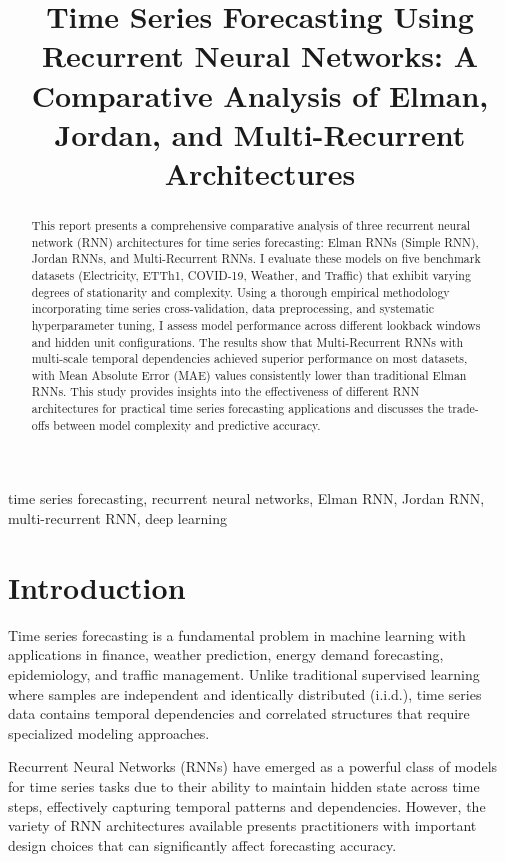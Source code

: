 \documentclass[conference]{IEEEtran}
\title{Time Series Forecasting Using Recurrent Neural Networks:
A Comparative Analysis of Elman, Jordan, and Multi-Recurrent Architectures}
\author{
    \IEEEauthorblockN{M Tashreeq Hartogh}
    \IEEEauthorblockA{
        27163245\\
        Department of Computer Science\\
        Stellenbosch University\\
        Stellenbosch, South Africa\\
        https://github.com/calebwidogast96-art/RNN-Forecasting
    }
}
\begin{document}
\maketitle

\begin{abstract}
This report presents a comprehensive comparative analysis of three
recurrent neural network (RNN) architectures for time series forecasting:
Elman RNNs (Simple RNN), Jordan RNNs, and Multi-Recurrent RNNs. I evaluate
these models on five benchmark datasets (Electricity, ETTh1, COVID-19,
Weather, and Traffic) that exhibit varying degrees of stationarity
and complexity. Using a thorough empirical methodology incorporating
time series cross-validation, data preprocessing, and systematic
hyperparameter tuning, I assess model performance across different lookback
windows and hidden unit configurations. The results show that
Multi-Recurrent RNNs with multi-scale temporal dependencies achieved
superior performance on most datasets, with Mean Absolute Error (MAE)
values consistently lower than traditional Elman RNNs. This study provides
insights into the effectiveness of different RNN architectures for practical
time series forecasting applications and discusses the trade-offs between model
complexity and predictive accuracy.
\end{abstract}

\begin{IEEEkeywords}
time series forecasting, recurrent neural networks, Elman RNN,
Jordan RNN, multi-recurrent RNN, deep learning
\end{IEEEkeywords}


\section{Introduction}

Time series forecasting is a fundamental problem in machine learning
with applications in finance, weather prediction, energy demand
forecasting, epidemiology, and traffic management. Unlike traditional
supervised learning where samples are independent and identically distributed
(i.i.d.), time series data contains temporal dependencies and correlated
structures that require specialized modeling approaches.

Recurrent Neural Networks (RNNs) have emerged as a powerful class of
models for time series tasks due to their ability to maintain hidden state
across time steps, effectively capturing temporal patterns and dependencies.
However, the variety of RNN architectures available presents practitioners
with important design choices that can significantly affect forecasting
accuracy.
\end{document}
